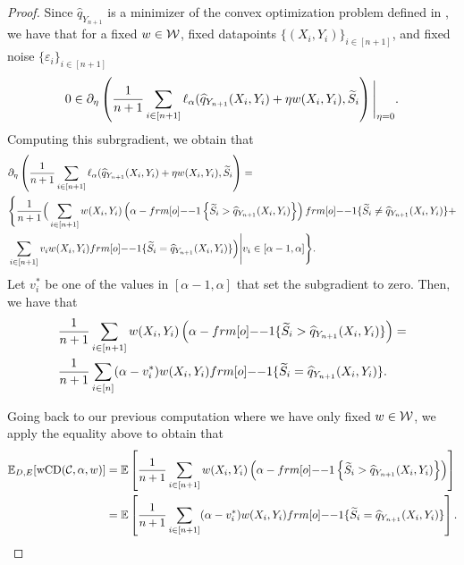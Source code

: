 \begin{proof}
    Since $\hat{q}_{Y_{n+1}}$ is a minimizer of the convex optimization problem defined in , we have that for a fixed $w \in {\cal W}$, fixed datapoints $\{(X_i, Y_i)\}_{i \in [n+1]}$, and fixed noise $\{\varepsilon_i\}_{i \in [n+1]}$
    \begin{align*}
         0 \in \partial_{\eta} \left( \frac{1}{n+1} \sum_{i \in [n+1]} \ell_\alpha(\widehat{q}_{Y_{n+1}}(X_i,Y_i) + \eta w(X_i,Y_i), {\widetilde{S}}_i\right) \Bigg|_{\eta = 0}.
    \end{align*}
    Computing this subrgradient, we obtain that 
    \begin{align*}
        &\partial_{\eta} \left( \frac{1}{n+1} \sum_{i \in [n+1]} \ell_\alpha(\hat{q}_{Y_{n+1}}(X_i,Y_i) + \eta w(X_i,Y_i), \tS_i\right) =\\
        & \Bigg\{\frac{1}{n+1} \Big( \sum_{i \in [n+1]} w(X_i,Y_i) \left(\alpha - \11\left\{\tS_i > \hat{q}_{Y_{n+1}}(X_i,Y_i)\right\}\right)\11\{\tS_i \neq \hat{q}_{Y_{n+1}}(X_i, Y_i)\}+ \\
        &\sum_{i \in [n+1]} v_i w(X_i,Y_i)\11\{\tS_i = \hat{q}_{Y_{n+1}}(X_i,Y_i)\}\Big)\Bigg| v_i \in [\alpha-1,\alpha]\Bigg\}.
    \end{align*}
    Let $v^*_i$ be one of the values in $ [\alpha-1, \alpha]$ that set the subgradient to zero. Then, we have that 
    \begin{align*}
        &\frac{1}{n+1}\sum_{i \in [n+1]}w(X_i,Y_i) \left(\alpha - \11\{ \tS_i > \hat{q}_{Y_{n+1}}(X_i,Y_i)\}\right) = \\
        &\frac{1}{n+1} \sum_{i \in [n]} (\alpha -v^*_i)w(X_i,Y_i)\11\{\tS_i = \hat{q}_{Y_{n+1}}(X_i,Y_i)\}.
    \end{align*}

    Going back to our previous computation where we have only fixed $w \in {\cal W}$, we apply the equality above to obtain that 
    \begin{align*}
         \EE_{D,E}[\wcovdev(\calC, \alpha,w)] &= 
          \EE \left[\frac{1}{n+1}\sum_{i \in [n+1]} w(X_i,Y_i)\left( \alpha - \11\left\{\tS_i > \hat{q}_{Y_{n+1}}(X_i,Y_i)\right\}\right)\right] \\
          &= \EE\left[ \frac{1}{n+1} \sum_{i \in [n+1] } (\alpha -v^*_i)w(X_i,Y_i) \11\{\tS_i = \hat{q}_{Y_{n+1}}(X_i,Y_i)\}\right].
    \end{align*}
    
    

\end{proof}
